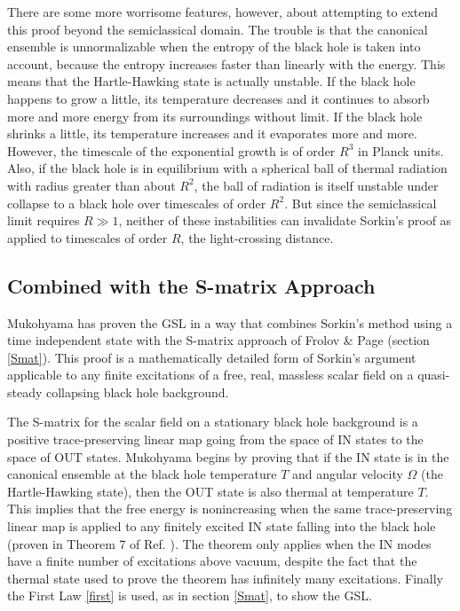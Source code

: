 \documentclass{article}
\begin{document}
There are some more worrisome features, however, about attempting to extend this proof beyond the semiclassical domain.  The trouble is that the canonical ensemble is unnormalizable when the entropy of the black hole is taken into account, because the entropy increases faster than linearly with the energy.  This means that the Hartle-Hawking state is actually unstable.  If the black hole happens to grow a little, its temperature decreases and it continues to absorb more and more energy from its surroundings without limit.  If the black hole shrinks a little, its temperature increases and it evaporates more and more.  However, the timescale of the exponential growth is of order $R^3$ in Planck units.  Also, if the black hole is in equilibrium with a spherical ball of thermal radiation with radius greater than about $R^2$, the ball of radiation is itself unstable under collapse to a black hole over timescales of order $R^2$.  But since the semiclassical limit requires $R \gg 1$, neither of these instabilities can invalidate Sorkin's proof as applied to timescales of order $R$, the light-crossing distance.

\subsection{Combined with the S-matrix Approach}\label{comb}

Mukohyama \cite{muko97} has proven the GSL in a way that combines Sorkin's method using a time independent state with the S-matrix approach of Frolov \& Page (section \ref{Smat}).  This proof is a mathematically detailed form of Sorkin's argument applicable to any finite excitations of a free, real, massless scalar field on a quasi-steady collapsing black hole background.

The S-matrix for the scalar field on a stationary black hole background is a positive trace-preserving linear map going from the space of IN states to the space of OUT states.  Mukohyama begins by proving that if the IN state is in the canonical ensemble at the black hole temperature $T$ and angular velocity $\Omega$ (the Hartle-Hawking state), then the OUT state is also thermal at temperature $T$.  This implies that the free energy is nonincreasing when the same trace-preserving linear map is applied to any finitely excited IN state falling into the black hole (proven in Theorem 7 of Ref. \cite{muko97}).  The theorem only applies when the IN modes have a finite number of excitations above vacuum, despite the fact that the thermal state used to prove the theorem has infinitely many excitations.  Finally the First Law \ref{first} is used, as in section \ref{Smat}, to show the GSL.
\end{document}
